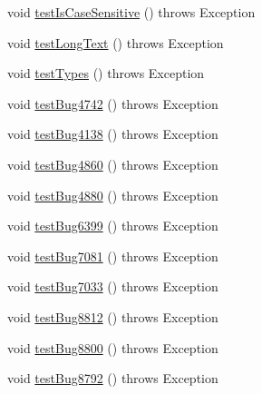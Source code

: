 \begin{DoxyCompactItemize}
\item 
void \mbox{\hyperlink{classtestsuite_1_1regression_1_1_meta_data_regression_test_adb0e8b0fcde945a0ebdfbd318975979b}{test\+Is\+Case\+Sensitive}} ()  throws Exception 
\item 
void \mbox{\hyperlink{classtestsuite_1_1regression_1_1_meta_data_regression_test_abc6512da546efa8175bd8245a997d554}{test\+Long\+Text}} ()  throws Exception 
\item 
void \mbox{\hyperlink{classtestsuite_1_1regression_1_1_meta_data_regression_test_a538c5b4ba85f2b4160bcaa4885f13142}{test\+Types}} ()  throws Exception 
\item 
void \mbox{\hyperlink{classtestsuite_1_1regression_1_1_meta_data_regression_test_aacb167d12465f3fad1e2723a82c2300e}{test\+Bug4742}} ()  throws Exception 
\item 
void \mbox{\hyperlink{classtestsuite_1_1regression_1_1_meta_data_regression_test_a5c0ea954c7204a811055ea0487e75862}{test\+Bug4138}} ()  throws Exception 
\item 
void \mbox{\hyperlink{classtestsuite_1_1regression_1_1_meta_data_regression_test_a9c33a8fd6a670158feb2efa4cbf966ad}{test\+Bug4860}} ()  throws Exception 
\item 
void \mbox{\hyperlink{classtestsuite_1_1regression_1_1_meta_data_regression_test_a5f79cbc323ee6b50a304811b962f4b37}{test\+Bug4880}} ()  throws Exception 
\item 
void \mbox{\hyperlink{classtestsuite_1_1regression_1_1_meta_data_regression_test_ad90f2153ff1faa28e41a28116ad400ca}{test\+Bug6399}} ()  throws Exception 
\item 
void \mbox{\hyperlink{classtestsuite_1_1regression_1_1_meta_data_regression_test_af6e2170c6b9b3b1ff9beddf8dc1c2aa9}{test\+Bug7081}} ()  throws Exception 
\item 
void \mbox{\hyperlink{classtestsuite_1_1regression_1_1_meta_data_regression_test_a810a4101f87e44b30caa45239a86b4d5}{test\+Bug7033}} ()  throws Exception 
\item 
void \mbox{\hyperlink{classtestsuite_1_1regression_1_1_meta_data_regression_test_a2e1523fa5764c3a574ab345132d80ccb}{test\+Bug8812}} ()  throws Exception 
\item 
void \mbox{\hyperlink{classtestsuite_1_1regression_1_1_meta_data_regression_test_a348ef415a6528252b8b3db3a8af6e3d9}{test\+Bug8800}} ()  throws Exception 
\item 
void \mbox{\hyperlink{classtestsuite_1_1regression_1_1_meta_data_regression_test_ac05ecaf65c43b94713d2dc0ab3430a94}{test\+Bug8792}} ()  throws Exception 

\end{DoxyCompactItemize}

